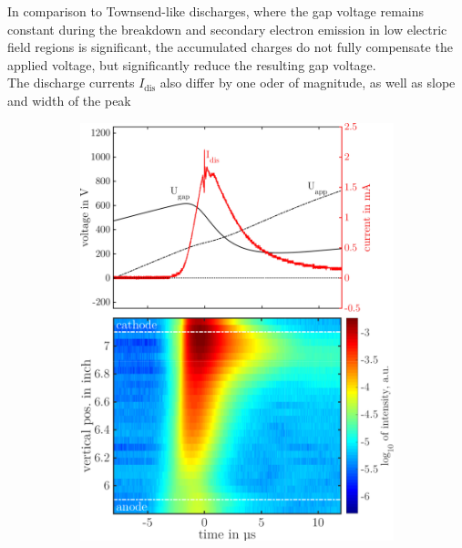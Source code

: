 \documentclass[a4paper,10pt,twoside]{article}
\newcommand{\ix}[1]{_\text{#1}}
\begin{document}
			In comparison to Townsend-like discharges, where the gap voltage remains constant during the breakdown and secondary electron emission in low electric field regions is significant, the accumulated charges do not fully compensate the applied voltage, but significantly reduce the resulting gap voltage.\\
			The discharge currents $I\ix{dis}$ also differ by one oder of magnitude, as well as slope and width of the peak 
			
		\onecolumn
				
			\begin{figure}
				\centering
				\begin{subfigure}[t]{0.49\textwidth}
					\includegraphics[width=\textwidth]{figures/706nm@sine/combination.pdf}
					\caption{}
					\label{img:combsine}
				\end{subfigure}
				\hfill
				\begin{subfigure}[t]{0.49\textwidth}

\end{subfigure}
\end{figure}
\end{document}
